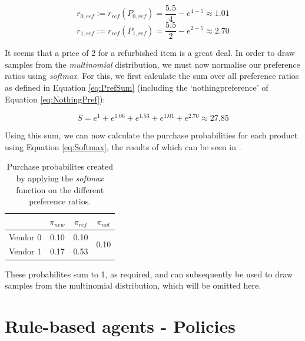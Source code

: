 \begin{equation}
	r_{0,ref} := r_{ref}(P_{0,ref}) = \frac{5.5}{4} - e^{4 - 5} \approx 1.01
\end{equation}
\begin{equation}
	r_{1,ref} := r_{ref}(P_{1,ref}) = \frac{5.5}{2} - e^{2 - 5} \approx 2.70
\end{equation}

It seems that a price of 2 for a refurbished item is a great deal. In order to draw samples from the \emph{multinomial} distribution, we must now normalise our preference ratios using \emph{softmax}. For this, we first calculate the sum over all preference ratios as defined in Equation \eqref{eq:PrefSum} (including the `nothingpreference' of Equation \eqref{eq:NothingPref}):

\begin{equation}
	S = e^{1} + e^{1.06} + e^{1.53} + e^{1.01} + e^{2.70} \approx 27.85
\end{equation}

Using this sum, we can now calculate the purchase probabilities for each product using Equation \eqref{eq:Softmax}, the results of which can be seen in .

\begin{table}[!htb]
	\begin{tabular}{|r|c|c|c|}
		\hline
		         & \(\pi_{new}\) & \(\pi_{ref}\) & \(\pi_{not}\)         \\\hline
		Vendor 0 & 0.10          & 0.10          & \multirow{2}{*}{0.10} \\\cline{1-3}
		Vendor 1 & 0.17          & 0.53          &                       \\\hline
	\end{tabular}\medskip
	\caption{Purchase probabilites created by applying the \emph{softmax} function on the different preference ratios.}\label{tab:CustomerExampleSoftmax}
\end{table}

\noindent These probabilites sum to 1, as required, and can subsequently be used to draw samples from the multinomial distribution, which will be omitted here.

\newpage
\section{Rule-based agents - Policies}\label{sec:AppendixPolicies}

